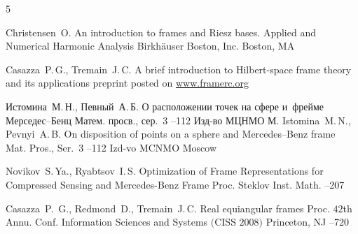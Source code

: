 \begin{thebibliography}{5}

\by Christensen~O.
\book An introduction to frames and Riesz bases. Applied and Numerical Harmonic Analysis
\publ Birkh\"auser Boston, Inc.
\publaddr Boston, MA


\by Casazza~P.\,G., Tremain~J.\,C.
\preprint A brief introduction to Hilbert-space frame theory and its applications
\preprintinfo preprint posted on \href{http://www.framerc.org/papers/IntroFrameTheory.pdf}{www.framerc.org}



\by Истомина~М.\,Н., Певный~А.\,Б.
\paper О расположении точек на сфере и~фрейме Мерседес--Бенц
\serial Матем. просв., сер.~3
--112
\publ Изд-во МЦНМО
\publaddr М.
\misctransl
\by Istomina~M.\,N., Pevnyi~A.\,B.
\paper On disposition of points on a sphere and Mercedes--Benz frame
\serial Mat. Pros., Ser.~3
--112
\publ Izd-vo MCNMO
\publaddr Moscow


\by Novikov~S.\,Ya., Ryabtsov~I.\,S.
\paper Optimization of Frame Representations for Compressed Sensing and Mercedes-Benz Frame
\jour Proc. Steklov Inst. Math.
--207


\by Casazza~P.~G., Redmond~D.,  Tremain~J.\,C.
\paper Real equiangular frames
\inbook Proc. $42$th Annu. Conf. Information Sciences and Systems $($CISS $2008)$
\publaddr Princeton, NJ
–720



\end{thebibliography}


\noindent
\hskip6.5cm \thedate \par\noindent
\hskip6.5cm\therevdate\par



\makeengtitle

\newpage


%
